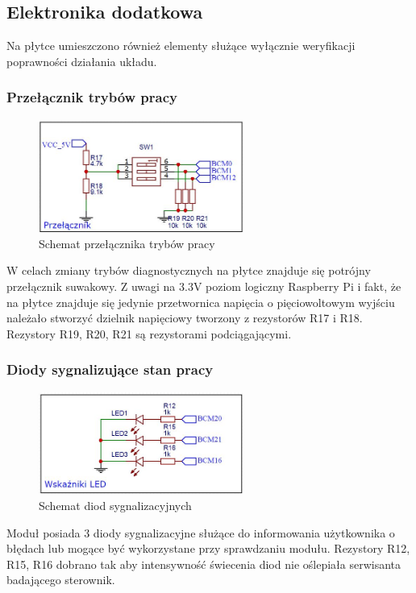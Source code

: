 \documentclass[12pt, eng, twoside, openany, final]{mgr}
\begin{document}
        \subsection{Elektronika dodatkowa}
        Na płytce umieszczono również elementy służące wyłącznie weryfikacji poprawności działania układu.
        
        \subsubsection{Przełącznik trybów pracy}
            \begin{figure}[H]
            \begin{center}
                \includegraphics[width=0.6\textwidth]{przelacznik1.jpg}
                \caption{Schemat przełącznika trybów pracy}
            \end{center}
            \end{figure}
        W celach zmiany trybów diagnostycznych na płytce znajduje się potrójny przełącznik suwakowy. Z uwagi na 3.3V poziom logiczny Raspberry Pi i fakt, że na płytce znajduje się jedynie przetwornica napięcia o pięciowoltowym wyjściu należało stworzyć dzielnik napięciowy tworzony z rezystorów R17 i R18. Rezystory R19, R20, R21 są rezystorami podciągającymi.  
        \subsubsection{Diody sygnalizujące stan pracy}
            \begin{figure}[H]
            \begin{center}
                \includegraphics[width=0.6\textwidth]{wskaznik1.jpg}
                \caption{Schemat diod sygnalizacyjnych} 
            \end{center}
            \end{figure}
        Moduł posiada 3 diody sygnalizacyjne służące do informowania użytkownika o błędach lub mogące być wykorzystane przy sprawdzaniu modułu. Rezystory R12, R15, R16 dobrano tak aby intensywność świecenia diod nie oślepiała serwisanta badającego sterownik.\newpage
        
\end{document}

